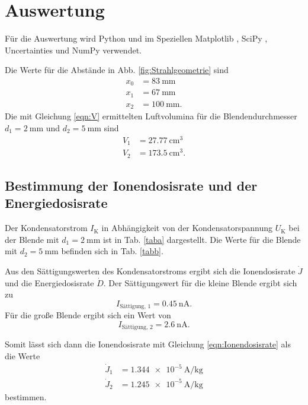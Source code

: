 \section{Auswertung}
\label{sec:Auswertung}

Für die Auswertung wird Python und im Speziellen
Matplotlib \cite{matplotlib}, SciPy \cite{scipy},
Uncertainties \cite{uncertainties} und NumPy \cite{numpy} verwendet.

\noindent Die Werte für die Abstände in Abb. \ref{fig:Strahlgeometrie} sind
\begin{align*}
    x_0 &= \SI{83}{\milli\meter} \\
    x_1 &= \SI{67}{\milli\meter} \\
    x_2 &= \SI{100}{\milli\meter}.
\end{align*}
Die mit Gleichung \eqref{eqn:V} ermittelten Luftvolumina
für die Blendendurchmesser $d_1 = \SI{2}{\milli\meter}$ und
$d_2 = \SI{5}{\milli\meter}$ sind
\begin{align*}
    V_1 &= \SI{27.77}{\centi\meter\cubed} \\ 
    V_2 &= \SI{173.5}{\centi\meter\cubed}.  
\end{align*}


\subsection{Bestimmung der Ionendosisrate und der Energiedosisrate}

Der Kondensatorstrom $I_\text{K}$ in Abhängigkeit von der
Kondensatorspannung $U_\text{K}$ bei der Blende mit
$d_1 = \SI{2}{\milli\meter}$ ist in Tab. \ref{taba}
dargestellt. Die Werte für die Blende mit 
$d_2 = \SI{5}{\milli\meter}$ befinden sich in Tab. \ref{tabb}.




Aus den Sättigungswerten des Kondensatorstroms ergibt sich die Ionendosisrate $\dot{J}$ und die Energiedosisrate $\dot{D}$. 
Der Sättigungswert für die kleine Blende ergibt sich zu 
\begin{equation*}
    I_\text{Sättigung, 1} = \SI{0.45}{\nano\ampere}.
\end{equation*}
Für die große Blende ergibt sich ein Wert von 
\begin{equation*}
    I_\text{Sättigung, 2} = \SI{2.6}{\nano\ampere}.
\end{equation*}

Somit lässt sich dann die Ionendosisrate mit Gleichung \eqref{eqn:Ionendosisrate} als die Werte  
\begin{align*}
    \dot{J}_\text{1} &= \SI{1.344e-5}{\ampere\per\kilo\gram}\\
    \dot{J}_\text{2} &= \SI{1.245e-5}{\ampere\per\kilo\gram} 
\end{align*}
bestimmen. 

